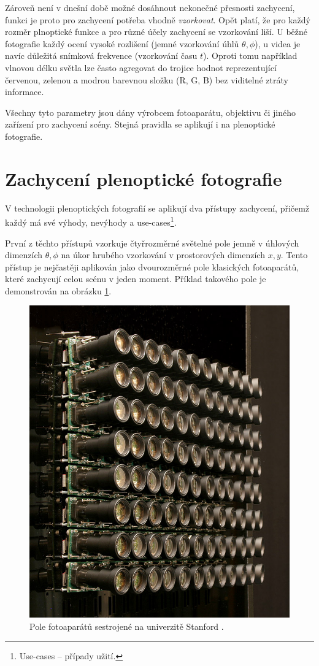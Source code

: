 Zároveň není v dnešní době možné dosáhnout nekonečné přesnosti zachycení, funkci je proto pro zachycení potřeba vhodně \textit{vzorkovat}.
Opět platí, že pro každý rozměr plnoptické funkce a pro různé účely zachycení se vzorkování liší.
U běžné fotografie každý ocení vysoké rozlišení (jemné vzorkování úhlů $\theta, \phi$), u videa je navíc důležitá snímková frekvence (vzorkování času $t$).
Oproti tomu například vlnovou délku světla lze často agregovat do trojice hodnot reprezentující červenou, zelenou a modrou barevnou složku (R, G, B) bez viditelné ztráty informace.

Všechny tyto parametry jsou dány výrobcem fotoaparátu, objektivu či jiného zařízení pro zachycení scény.
Stejná pravidla se aplikují i na plenoptické fotografie.

\section{Zachycení plenoptické fotografie}
V technologii plenoptických fotografií se aplikují dva přístupy zachycení, přičemž každý má své výhody, nevýhody a use-cases\footnote{Use-cases -- případy užití.}.


První z těchto přístupů vzorkuje čtyřrozměrné světelné pole jemně v úhlových dimenzích $\theta, \phi$ na úkor hrubého vzorkování v prostorových dimenzích $x, y$.
Tento přístup je nejčastěji aplikován jako dvourozměrné pole klasických fotoaparátů, které zachycují celou scénu v jeden moment.
Příklad takového pole je demonstrován na obrázku \ref{stanfordArray}.

\label{light-field-capture}
\begin{figure}[h]
  \centering
  \includegraphics[width=.4\textwidth]{obrazky-figures/stanford-array.jpg}
	\caption{Pole fotoaparátů sestrojené na univerzitě Stanford \cite{stanford-array}.}
	\label{stanfordArray}
\end{figure}

